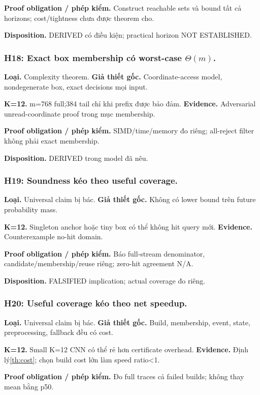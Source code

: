 \documentclass[11pt,a4paper]{article}
\theoremstyle{remark}
\begin{document}
\textbf{Proof obligation / phép kiểm.} Construct reachable sets và bound tất cả horizons; cost/tightness chưa được theorem cho.

\textbf{Disposition.} DERIVED có điều kiện; practical horizon NOT ESTABLISHED.

\subsubsection*{H18: Exact box membership có worst-case $\Theta(m)$.}
\textbf{Loại.} Complexity theorem. \textbf{Giả thiết gốc.} Coordinate-access model, nondegenerate box, exact decisions mọi input.

\textbf{K=12.} m=768 full;384 tail chỉ khi prefix được bảo đảm. \textbf{Evidence.} Adversarial unread-coordinate proof trong mục membership.

\textbf{Proof obligation / phép kiểm.} SIMD/time/memory đo riêng; all-reject filter không phải exact membership.

\textbf{Disposition.} DERIVED trong model đã nêu.

\subsubsection*{H19: Soundness kéo theo useful coverage.}
\textbf{Loại.} Universal claim bị bác. \textbf{Giả thiết gốc.} Không có lower bound trên future probability mass.

\textbf{K=12.} Singleton anchor hoặc tiny box có thể không hit query mới. \textbf{Evidence.} Counterexample no-hit domain.

\textbf{Proof obligation / phép kiểm.} Báo full-stream denominator, candidate/membership/reuse riêng; zero-hit agreement N/A.

\textbf{Disposition.} FALSIFIED implication; actual coverage đo riêng.

\subsubsection*{H20: Useful coverage kéo theo net speedup.}
\textbf{Loại.} Universal claim bị bác. \textbf{Giả thiết gốc.} Build, membership, event, state, preprocessing, fallback đều có cost.

\textbf{K=12.} Small K=12 CNN có thể rẻ hơn certificate overhead. \textbf{Evidence.} Định lý\ref{th:cost}; chọn build cost lớn làm speed ratio<1.

\textbf{Proof obligation / phép kiểm.} Đo full traces cả failed builds; không thay mean bằng p50.
\end{document}
